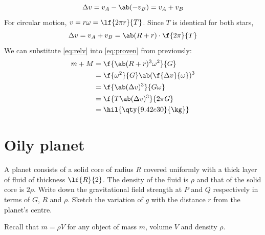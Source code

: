 \begin{equation*}
	\Delta {v} = v_A - \ab(-v_B) = v_A + v_B
\end{equation*}
For circular motion, \(v = r\omega = \lf{2\pi r}{T}\).
Since \(T\) is identical for both stars,
\begin{equation}
	\label{eq:relv}
	\Delta {v} = v_A + v_B = \ab(R+r)\cdot\f{2\pi}{T}
\end{equation}
We can substitute \cref{eq:relv} into \cref{eq:proven} from previously:
\begin{align*}
	m+M & = \f{\ab(R+r)^3\omega^2}{G}                   \\
	    & = \f{\omega^2}{G}\ab(\f{\Delta{v}}{\omega})^3 \\
	    & = \f{\ab(\Delta{v})^3}{G\omega}               \\
	    & = \f{T\ab(\Delta{v})^3}{2\pi G}               \\
	    & = \hil{\qty{9.42e30}{\kg}}
\end{align*}

\section{Oily planet}
\begin{problem}
A planet consists of a solid core of radius \(R\) covered uniformly with a thick
layer of fluid of thickness \(\lf{R}{2}\). The density of the fluid is \(\rho\) and
that of the solid core is \(2\rho\). Write down the gravitational field strength at \(P\)
and \(Q\) respectively in terms of \(G\), \(R\) and \(\rho\). Sketch the variation of \(g\) with the distance \(r\) from the planet's centre.
\end{problem}
Recall that \(m = \rho V\) for any object of mass \(m\), volume \(V\) and density \(\rho\).

